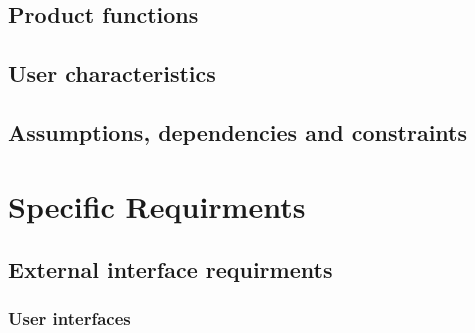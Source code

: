 \documentclass[12pt,a4paper]{report}
\begin{document}
	\section{Product functions}
	\section{User characteristics}
	\section{Assumptions, dependencies and constraints}

\chapter{Specific Requirments}
	\section{External interface requirments}
		\subsection{User interfaces}
\end{document}
